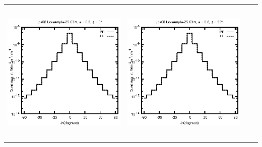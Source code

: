 \begin{tabular}{c c c c}
\includegraphics[height=7cm]{../eps/jok08_Ld_sample_25.00m_fwd.eps} &
\includegraphics[height=7cm]{../eps/jok08_Ld_sample_25.00m_cross.eps} \\
\end{tabular}

\pagebreak

